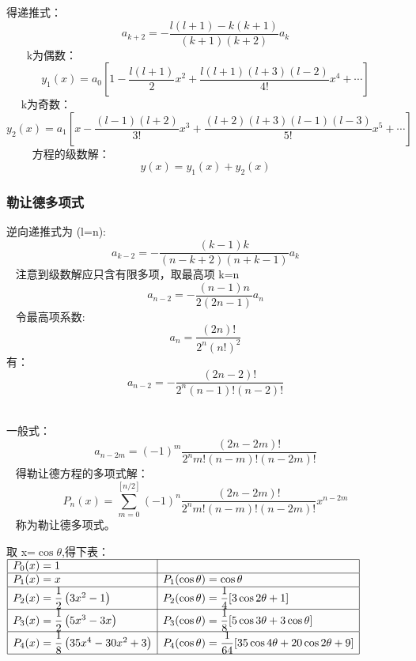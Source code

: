 \begin{frame}
	得递推式：
	\begin{equation*}
		a_{k+2}=-\frac{l(l+1)-k(k+1)}{(k+1)(k+2) }a_{k}
	\end{equation*}	   
	k为偶数：
	\begin{equation*}
		y_{1}(x)=a_{0}\left[1-\frac{l(l+1)}{2} x^{2}+\frac{l(l+1)(l+3)(l-2)}{4 !} x^{4}+\cdots\right]
	\end{equation*}	  
	k为奇数：
	\begin{equation*}
		y_{2}(x)=a_{1}\left[x-\frac{(l-1)(l+2)}{3 !} x^{3}+\frac{(l+2)(l+3)(l-1)(l-3)}{5 !} x^{5}+\cdots\right]
	\end{equation*}	    
	方程的级数解：\[ y(x)=  y_{1}(x) +  y_{2}(x)  \]	
\end{frame}	

\begin{frame}
	\frametitle{勒让德多项式}
	逆向递推式为 (l=n):
	\begin{equation*}
		a_{k-2}=-\frac{(k-1) k}{(n-k+2)(n+k-1)} a_{k}
	\end{equation*}	 
	注意到级数解应只含有限多项，取最高项 k=n 
	\begin{equation*}
		a_{n-2}=-\frac{(n-1) n}{2(2n-1)} a_{n}
	\end{equation*}	 
	令最高项系数: \[a_n=\frac{(2n)!}{2^n (n!)^2} \]
	有：
	\begin{equation*}
		a_{n-2}=-\frac{(2 n-2) !}{2^{n}(n-1) !(n-2) !}
	\end{equation*}	 
\end{frame}	

\begin{frame}
	一般式：
	\begin{equation*}
		a_{n-2 m}=(-1)^{m} \frac{(2 n-2 m) !}{2^{n} m !(n-m) !(n-2 m) !}
	\end{equation*}	 
	得勒让德方程的多项式解：
	\begin{equation*}
		P_{n}(x)=\sum_{m=0}^{[n / 2]}(-1)^{n} \frac{(2 n-2 m) !}{2^{n} m !(n-m) !(n-2 m) !} x^{n-2 m}
	\end{equation*}	 
	称为勒让德多项式。
\end{frame}	

\begin{frame}
	取 x=$\cos\theta$,得下表：\\
	{\small $\begin{array}{|l|l|}
		\hline P_{0}(x)=1 & \\
		\hline P_{1}(x)=x & P_{1}(\cos \theta)=\cos \theta \\
		\hline P_{2}(x)=\dfrac{1}{2}\left(3 x^{2}-1\right) & P_{2}(\cos \theta)=\dfrac{1}{4}[3 \cos 2 \theta+1] \\
		\hline P_{3}(x)=\dfrac{1}{2}\left(5 x^{3}-3 x\right) & P_{3}(\cos \theta)=\dfrac{1}{8}[5 \cos 3 \theta+3 \cos \theta] \\
		\hline P_{4}(x)=\dfrac{1}{8}\left(35 x^{4}-30 x^{2}+3\right) & P_{4}(\cos \theta)=\dfrac{1}{64}[35 \cos 4 \theta+20 \cos 2 \theta+9] \\
		\hline
	\end{array}$}
\end{frame}	 

